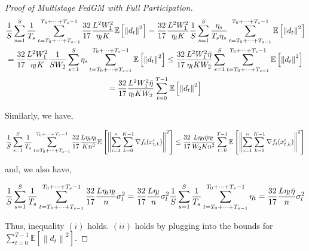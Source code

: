 \begin{proof}[Proof of Multistage FedGM with Full Participation]
\begin{equation}
\begin{gathered}
\frac{1}{S} \sum_{s=1}^{S} \frac{1}{T_s} \sum_{t=T_0+\dots+T_{s-1}}^{T_0+\dots+T_s-1}\frac{32}{17}\frac{L^2W_1^2}{\eta_l K}\mathbb{E}\left[\left\| d_t\right\|^2\right] = \frac{32}{17}\frac{L^2 W_1^2}{\eta_l K}  \frac{1}{S} \sum_{s=1}^{S} \frac{ \eta_s }{ T_s \eta_s} \sum_{t=T_0+\dots+T_{s-1}}^{T_0+\dots+T_s-1} \mathbb{E}\left[\left\| d_t\right\|^2\right]\\
= \frac{32}{17}\frac{L^2 W_1^2}{\eta_l K} \frac{1}{SW_2} \sum_{s=1}^{S} \eta_s \sum_{t=T_0+\dots+T_{s-1}}^{T_0+\dots+T_s-1} \mathbb{E}\left[\left\| d_t\right\|^2\right] \leq \frac{32}{17}\frac{L^2 W_1^2 \Bar{\eta}}{\eta_l K W_2}\sum_{s=1}^{S}\sum_{t=T_0+\dots+T_{s-1}}^{T_0+\dots+T_s-1} \mathbb{E}\left[\left\| d_t\right\|^2\right] \\
= \frac{32}{17}\frac{L^2 W_1^2 \Bar{\eta}}{\eta_l K W_2}\sum_{t=0}^{T-1} \mathbb{E}\left[\left\| d_t\right\|^2\right]
\end{gathered}\nonumber
\end{equation}

Similarly, we have,

\begin{equation}
\begin{gathered}
\frac{1}{S} \sum_{s=1}^{S} \frac{1}{T_s} \sum_{t=T_0+\dots+T_{s-1}}^{T_0+\dots+T_s-1} \frac{32}{17} \frac{L\eta_t  \eta_l }{K n^2}\mathbb{E}\left[\left\| \sum_{i=1}^n\sum_{k=0}^{K-1}  \nabla f_i(x_{t,k}^i) \right\|^2\right] \leq \frac{32}{17} \frac{L \eta_0\Bar{\eta}  \eta_l }{ W_2 K n^2}\sum_{t=0}^{T-1}\mathbb{E}\left[\left\| \sum_{i=1}^n\sum_{k=0}^{K-1}  \nabla f_i(x_{t,k}^i) \right\|^2\right]
\end{gathered}\nonumber
\end{equation}

and, we also have,

\begin{equation}
\begin{gathered}
\frac{1}{S} \sum_{s=1}^{S} \frac{1}{T_s} \sum_{t=T_0+\dots+T_{s-1}}^{T_0+\dots+T_s-1} \frac{32}{17} \frac{L \eta_t \eta_l }{n}\sigma_l^2 = \frac{32}{17}\frac{L \eta_l }{n}\sigma_l^2\frac{1}{S} \sum_{s=1}^{S} \frac{1}{T_s} \sum_{t=T_0+\dots+T_{s-1}}^{T_0+\dots+T_s-1}\eta_t = \frac{32}{17}\frac{L \eta_l \Bar{\eta}}{n}\sigma_l^2
\end{gathered}\nonumber
\end{equation}

Thus, inequality $(i)$ holds. $(ii)$ holds by plugging into the bounds for $\sum_{t=0}^{T-1}\mathbb{E}\left[\left\|d_t\right\|^2\right]$.


\end{proof}
